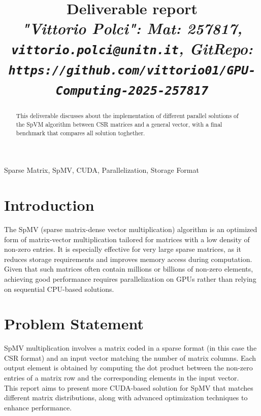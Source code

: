 \documentclass[conference]{IEEEtran}
\begin{document}
\title{Deliverable report \\
\footnotesize \textit{"Vittorio Polci": Mat: 257817, \texttt{vittorio.polci@unitn.it}, GitRepo: \texttt{https://github.com/vittorio01/GPU-Computing-2025-257817}}}

\maketitle

\begin{abstract}
This deliverable discusses about the implementation of different parallel solutions of the SpVM algorithm between CSR matrices and a general vector,
with a final benchmark that compares all solution toghether. 

\end{abstract}

\begin{IEEEkeywords}
Sparse Matrix, SpMV, CUDA, Parallelization, Storage Format
\end{IEEEkeywords}

\section{Introduction}
The SpMV (sparse matrix-dense vector multiplication) algorithm is an optimized form of matrix-vector multiplication tailored for matrices with a low density of non-zero entries. 
It is especially effective for very large sparse matrices, as it reduces storage requirements and improves memory access during computation. Given that such matrices often contain millions 
or billions of non-zero elements, achieving good performance requires parallelization on GPUs rather than relying on sequential CPU-based solutions.

\section{Problem Statement}
SpMV multiplication involves a matrix coded in a sparse format (in this case the CSR format) and an input vector matching the number of matrix columns. Each output element is obtained by computing the dot product 
between the non-zero entries of a matrix row and the corresponding elements in the input vector. 
\\
This report aims to present more CUDA-based solution for SpMV that matches different matrix distributions, along with advanced optimization techniques to enhance performance.
\end{document}
